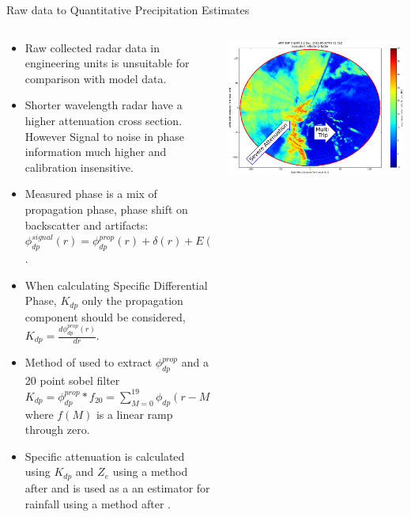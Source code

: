 \documentclass[final]{beamer}
\begin{document}
\begin{frame}{}
\begin{columns}[t]
\begin{column}{.3\linewidth}
     \begin{block}{Raw data to Quantitative Precipitation Estimates}
 	\begin{columns}[t]
		\begin{column}{.5\linewidth}
		\begin{itemize}
		\item Raw collected radar data in engineering units is unsuitable for comparison with model data. 
		\item Shorter wavelength radar have a higher attenuation cross section. However Signal to noise in phase information much higher and calibration insensitive.
		\item Measured phase is a mix of propagation phase, phase shift on backscatter and artifacts: {\tiny $\phi_{dp}^{signal}(r) = \phi_{dp}^{prop}(r) + \delta(r) + E(r)$}.
		\item When calculating Specific Differential Phase, {\small $K_{dp}$} only the propagation component should be considered, {\tiny $K_{dp} = \frac{d\phi_{dp}^{prop}(r)}{dr}$}.
		\item Method of \citet{giangrande_application_2013} used to extract {\small $\phi_{dp}^{prop}$} and a 20 point sobel filter 
		{\tiny$K_{dp} = \phi_{dp}^{prop} \ast f_{20} = \sum\limits_{M=0}^{19}   \phi_{dp}(r-M)f(M)$} where $f(M)$ is a linear ramp through zero. 
		\item Specific attenuation is calculated using {\small $K_{dp}$} and {\small $Z_e$} using a method after \citet{gu_polarimetric_2011} and is used as a an estimator for rainfall 
		using a method after \cite{ryzhkov_potential_2014}.
		\end{itemize}
		\end{column}
                \begin{column}{.5\linewidth}
                \begin{columns}[t]
                \begin{column}{.5\linewidth}
                		\includegraphics[width=1.0\linewidth]{figures/ze.png}\\[1ex]  %

\end{column}
\end{columns}
\end{column}
\end{columns}
\end{block}
\end{column}
\end{columns}
\end{frame}
\end{document}
